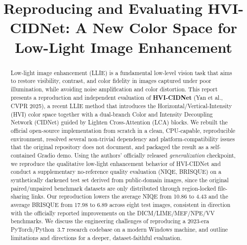 \documentclass[conference]{IEEEtran}
\begin{document}
\title{Reproducing and Evaluating HVI-CIDNet: A New Color Space for Low-Light Image Enhancement}

\author{
\and
{}
\and
{}
}

\maketitle

\begin{abstract}
Low-light image enhancement (LLIE) is a fundamental low-level vision task that
aims to restore visibility, contrast, and color fidelity in images captured
under poor illumination, while avoiding noise amplification and color
distortion. This report presents a reproduction and independent evaluation of
\textbf{HVI-CIDNet} (Yan et al., CVPR 2025), a recent LLIE method that
introduces the Horizontal/Vertical-Intensity (HVI) color space together with
a dual-branch Color and Intensity Decoupling Network (CIDNet) guided by
Lighten Cross-Attention (LCA) blocks. We rebuilt the official open-source
implementation from scratch in a clean, CPU-capable, reproducible environment,
resolved several non-trivial dependency and platform-compatibility issues that
the original repository does not document, and packaged the result as a
self-contained Gradio demo. Using the authors' officially released
\emph{generalization} checkpoint, we reproduce the qualitative low-light
enhancement behavior of HVI-CIDNet and conduct a supplementary no-reference
quality evaluation (NIQE, BRISQUE) on a synthetically darkened test set
derived from public-domain images, since the original paired/unpaired
benchmark datasets are only distributed through region-locked file-sharing
links. Our reproduction lowers the average NIQE from 10.86 to 4.43 and the
average BRISQUE from 17.98 to 6.89 across eight test images, consistent in
direction with the officially reported improvements on the DICM/LIME/MEF/NPE/VV
benchmarks. We discuss the engineering challenges of reproducing a 2023-era
PyTorch/Python~3.7 research codebase on a modern Windows machine, and outline
limitations and directions for a deeper, dataset-faithful evaluation.
\end{abstract}
\end{document}
